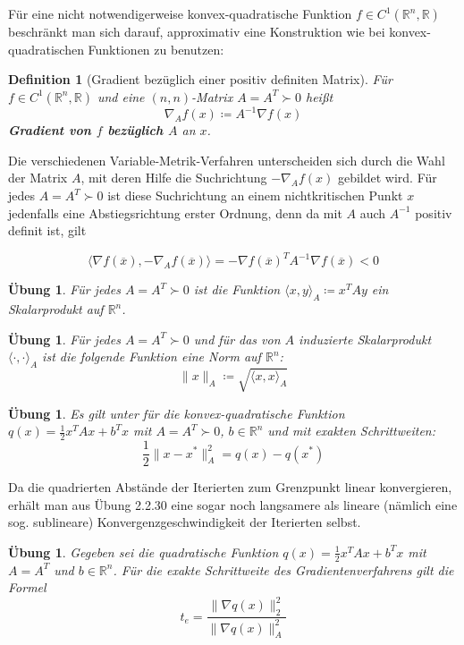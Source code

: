 \documentclass[11pt]{scrreprt}
\newcounter{thm}
\theoremstyle{thmstyle}
\numberwithin{thm}{section}
\newtheorem{definition}[thm]{Definition}
\newtheorem{uebung}[thm]{Übung}
\begin{document}
Für eine nicht notwendigerweise konvex-quadratische Funktion $f \in C^1(\mathbb{R}^n, \mathbb{R})$ beschränkt man sich darauf, approximativ eine Konstruktion wie bei konvex-quadratischen Funktionen zu benutzen:

\setcounter{thm}{26}

\begin{definition}[Gradient bezüglich einer positiv definiten Matrix]
	Für $f \in C^1(\mathbb{R}^n, \mathbb{R})$ und eine $(n, n)$-Matrix $A = A^T \succ 0$ heißt
	$$ \nabla_A f(x) \coloneqq A^{-1} \nabla f(x) $$
	\textbf{Gradient von $f$ bezüglich $A$} an $x$.
\end{definition} 

Die verschiedenen Variable-Metrik-Verfahren unterscheiden sich durch die Wahl der Matrix $A$, mit deren Hilfe die Suchrichtung $- \nabla_A f(x)$ gebildet wird. Für jedes $A = A^T \succ 0$ ist diese Suchrichtung an einem nichtkritischen Punkt $x$ jedenfalls eine Abstiegsrichtung erster Ordnung, denn da mit $A$ auch $A^{-1}$ positiv definit ist, gilt

$$ \langle \nabla f(\overline{x}), - \nabla_A f(\overline{x}) \rangle = - \nabla f(\overline{x})^T A^{-1} \nabla f(\overline{x}) < 0 $$

\begin{uebung}
	Für jedes $A = A^T \succ 0$ ist die Funktion $\langle x, y \rangle_A \coloneqq x^T A y$ ein Skalarprodukt auf $\mathbb{R}^n$.
\end{uebung}

\begin{uebung}
	Für jedes $A = A^T \succ 0$ und für das von $A$ induzierte Skalarprodukt $\langle \cdot, \cdot \rangle_A$ ist die folgende Funktion eine Norm auf $\mathbb{R}^n$:
	$$ \| x \|_A \coloneqq \sqrt{\langle x, x \rangle_{A}} $$
\end{uebung}

\begin{uebung}
	Es gilt unter für die konvex-quadratische Funktion $q(x) = \frac{1}{2} x^T A x + b^T x$ mit $A = A^T \succ 0$, $b \in \mathbb{R}^n$ und mit exakten Schrittweiten:
	$$ \frac{1}{2} \| x - x^* \|_A^2 = q(x) - q(x^*) $$
\end{uebung}

Da die quadrierten Abstände der Iterierten zum Grenzpunkt linear konvergieren, erhält man aus Übung 2.2.30 eine sogar noch langsamere als lineare (nämlich eine sog. sublineare) Konvergenzgeschwindigkeit der Iterierten selbst.

\begin{uebung}
	Gegeben sei die quadratische Funktion $q(x) = \frac{1}{2} x^T A x + b^T x$ mit $A = A^T$ und $b \in \mathbb{R}^n$. Für die exakte Schrittweite des Gradientenverfahrens gilt die Formel 
	$$ t_e = \frac{\| \nabla q(x) \|_2^2}{\| \nabla q(x) \|_A^2} $$
\end{uebung}
\end{document}
